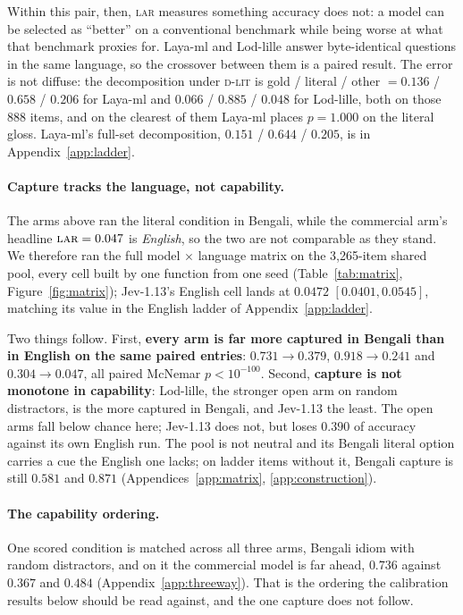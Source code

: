 \documentclass[11pt]{article}
\newcommand{\Dlit}{\textsc{d-lit}}
\newcommand{\LAR}{\textsc{lar}}
\begin{document}
Within this pair, then, \LAR{} measures something accuracy does not: a model
can be selected as ``better'' on a conventional benchmark while being worse at
what that benchmark proxies for. Laya-ml and Lod-lille answer byte-identical questions in the same language, so
the crossover between them is a paired result. The error is not diffuse:
the decomposition under \Dlit{} is gold / literal / other $= 0.136$ / $0.658$ /
$0.206$ for Laya-ml and $0.066$ / $0.885$ / $0.048$ for Lod-lille, both on those
888 items, and on the clearest of them Laya-ml places $p = 1.000$ on the literal
gloss. Laya-ml's full-set decomposition, $0.151$ / $0.644$ / $0.205$, is in
Appendix~\ref{app:ladder}.

\paragraph{Capture tracks the language, not capability.} The arms above ran the
literal condition in Bengali, while the commercial arm's headline $\LAR = 0.047$ is
\emph{English}, so the two are not comparable as they stand. We therefore ran the
full model $\times$ language matrix on the 3{,}265-item shared pool, every cell
built by one function from one seed (Table~\ref{tab:matrix},
Figure~\ref{fig:matrix}); Jev-1.13's English cell lands at $0.0472$
$[0.0401, 0.0545]$, matching its value in the English ladder of
Appendix~\ref{app:ladder}.

Two things follow. First, \textbf{every arm is far more captured in Bengali than in
English on the same paired entries}: $0.731 \rightarrow 0.379$, $0.918 \rightarrow
0.241$ and $0.304 \rightarrow 0.047$, all paired McNemar $p < 10^{-100}$. Second,
\textbf{capture is not monotone in capability}: Lod-lille, the stronger open arm on
random distractors, is the more captured in Bengali, and Jev-1.13 the least. The
open arms fall below chance here; Jev-1.13 does not, but loses $0.390$ of accuracy
against its own English run. The pool is not neutral and its Bengali literal option
carries a cue the English one lacks; on ladder items without it,
Bengali capture is still $0.581$ and $0.871$ (Appendices~\ref{app:matrix},
\ref{app:construction}).



\paragraph{The capability ordering.} One scored condition is matched across all three
arms, Bengali idiom with random distractors, and on it the commercial model is far
ahead, $0.736$ against $0.367$ and $0.484$ (Appendix~\ref{app:threeway}). That is
the ordering the calibration results below should be read against, and the one
capture does not follow.
\end{document}
